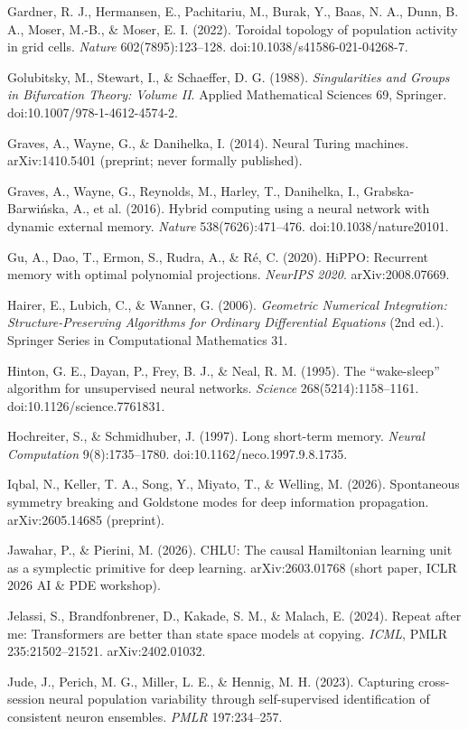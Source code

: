\documentclass{article}
\begin{document}
{Gardner, R. J., Hermansen, E., Pachitariu, M., Burak, Y., Baas, N. A., Dunn, B. A., Moser, M.-B., \& Moser, E. I. (2022). Toroidal topology of population activity in grid cells. \emph{Nature} 602(7895):123--128. doi:10.1038/s41586-021-04268-7.\par
Golubitsky, M., Stewart, I., \& Schaeffer, D. G. (1988). \emph{Singularities and Groups in Bifurcation Theory: Volume II}. Applied Mathematical Sciences 69, Springer. doi:10.1007/978-1-4612-4574-2.\par
Graves, A., Wayne, G., \& Danihelka, I. (2014). Neural Turing machines. arXiv:1410.5401 (preprint; never formally published).\par
Graves, A., Wayne, G., Reynolds, M., Harley, T., Danihelka, I., Grabska-Barwi\'nska, A., et al. (2016). Hybrid computing using a neural network with dynamic external memory. \emph{Nature} 538(7626):471--476. doi:10.1038/nature20101.\par
Gu, A., Dao, T., Ermon, S., Rudra, A., \& R\'e, C. (2020). HiPPO: Recurrent memory with optimal polynomial projections. \emph{NeurIPS 2020}. arXiv:2008.07669.\par
Hairer, E., Lubich, C., \& Wanner, G. (2006). \emph{Geometric Numerical Integration: Structure-Preserving Algorithms for Ordinary Differential Equations} (2nd ed.). Springer Series in Computational Mathematics 31.\par
Hinton, G. E., Dayan, P., Frey, B. J., \& Neal, R. M. (1995). The ``wake-sleep'' algorithm for unsupervised neural networks. \emph{Science} 268(5214):1158--1161. doi:10.1126/science.7761831.\par
Hochreiter, S., \& Schmidhuber, J. (1997). Long short-term memory. \emph{Neural Computation} 9(8):1735--1780. doi:10.1162/neco.1997.9.8.1735.\par
Iqbal, N., Keller, T. A., Song, Y., Miyato, T., \& Welling, M. (2026). Spontaneous symmetry breaking and Goldstone modes for deep information propagation. arXiv:2605.14685 (preprint).\par
Jawahar, P., \& Pierini, M. (2026). CHLU: The causal Hamiltonian learning unit as a symplectic primitive for deep learning. arXiv:2603.01768 (short paper, ICLR 2026 AI \& PDE workshop).\par
Jelassi, S., Brandfonbrener, D., Kakade, S. M., \& Malach, E. (2024). Repeat after me: Transformers are better than state space models at copying. \emph{ICML}, PMLR 235:21502--21521. arXiv:2402.01032.\par
Jude, J., Perich, M. G., Miller, L. E., \& Hennig, M. H. (2023). Capturing cross-session neural population variability through self-supervised identification of consistent neuron ensembles. \emph{PMLR} 197:234--257.\par
}
\end{document}
